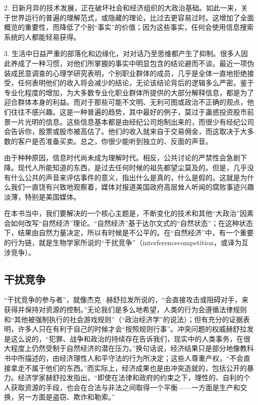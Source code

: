 2. 日新月异的技术发展，正在破坏社会和经济组织的大政治基础。如此一来，关于世界运行的普遍的理解范式，或隐藏的理论，比过去更容易过时。这增加了全面概览的重要性，而降低了个别“事实”的价值；因为这些事实，任何会使用信息搜索系统的人都能轻易获得。

3. 生活中日益严重的部落化和边缘化，对对话乃至思维都产生了抑制。很多人因此养成了一种习惯，对他们所掌握的事实中明显包含的结论避而不谈。最近一项伪装成民意调查的心理学研究表明，个别职业群体的成员，几乎是全体一直地拒绝接受，任何表明他们的收入将会减少的结论，无论该结论背后的逻辑多么严密。鉴于专业化程度的增加，为大多数专业化职业群体所提供的大部分解释信息，都是为了迎合群体本身的利益。而对于那些可能不文明、无利可图或政治不正确的观点，他们往往不感兴趣。这是一种普遍的趋势，其中最好的例子，莫过于蛊惑投资股市前景一片光明的信息。这些信息基本都是由经纪公司炮制出来的，而很少有经纪公司会告诉你，股票或股市被高估了。他们的收入就来自于交易佣金，而这取决于大多数的客户是否准备买卖。总之，你很少能听到独立的、反面的声音。

由于种种原因，信息时代尚未成为理解时代。相反，公共讨论的严禁性会急剧下降。现代人所能知道的东西，是过去任何时候的祖先都望尘莫及的。但是，几乎没有什么公共的声音来评估事件的意义，指出什么是真的，什么是假的。这就是为什么我们一直饶有兴致地观察着，媒体对报道美国政府高层耸人听闻的腐败事迹兴趣淡薄，特别是美国媒体。

在本书当中，我们要解决的一个核心主题是，不断变化的技术和其他“大政治”因素会如何改写“自然经济”理论。“自然经济”基于达尔文式的“自然状态”；在这种状态下，结果由自然力量决定，所以有时候是不公平的。在“自然经济”中，有一个重要的行为链，就是生物学家所说的“干扰竞争”（interferencecompetition，或译为互涉竞争）。

\subsection{干扰竞争}
“干扰竞争的参与者”，就像杰克·赫舒拉发所说的，“会直接攻击或阻碍对手，来获得并保持对资源的控制。”无论我们是多么地希望，人类的行为会遵循法律规则和“其他被强制执行的社会游戏规则”（“政治经济学”的说法）；但有充分的证据表明，许多人只在有利于自己的时候才会“按照规则行事”。冲突问题的权威赫舒拉发是这么说的，“犯罪、战争和政治的持续存在告诉我们，现实中的人类事务，在很大程度上仍然受制于自然经济的潜在压力。”换句话说，经济结果只是部分地像教科书中所描述的，由经济理性人和平守法的行为所决定；这些人尊重产权，“不会直接拿走不属于他们的东西。”而实际上，经济成果也是由冲突造就的，包括公开的暴力。经济学家赫舒拉发指出，“即使在法律和政府的约束之下，理性的、自利的个人获取资源的手段，也会在合法与非法之间取得一个平衡——一方面是生产和交换，另一方面是盗窃、欺诈和勒索。”


